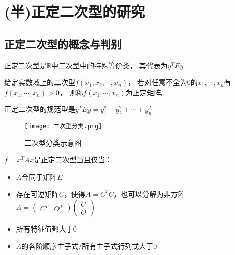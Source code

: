 \section{(半)正定二次型的研究}

\subsection{正定二次型的概念与判别}

正定二次型是$\mathbb{R}$中二次型中的特殊等价类，
其代表为$y^TEy$

\begin{definition}[正定二次型]
  给定实数域上的二次型$f(x_1,x_2,\cdots,x_n)$，
  若对任意不全为$0$的$x_1,\cdots,x_n$有$f(x_1,\cdots,x_n) > 0$，
  则称$f(x_1,\cdots,x_n)$为正定矩阵。
\end{definition}

\begin{theorem}[正定二次型的规范型]
  正定二次型的规范型是$y^TEy = y_1^2 + y_2^2 + \cdots + y_n^2$
\end{theorem}


\begin{figure}[htp]
  \centering
  \texttt{[image: 二次型分类.png]}
  \caption{二次型分类示意图}
\end{figure}

\begin{theorem}[正定充要条件]
  $f = x^TAx$是正定二次型当且仅当：
  \begin{itemize}
  \item $A$合同于矩阵$E$
  \item 存在可逆矩阵$C$，使得$A = C^T C$，也可以分解为非方阵$
    A  = \left(
      \begin{array}{cc}
        C^T&O^T
      \end{array}
    \right) \left(
      \begin{array}{c}
        C\\
        O
      \end{array}
    \right)
    $
  \item 所有特征值都大于$0$
  \item $A$的各阶顺序主子式/所有主子式行列式大于$0$
  \end{itemize}
\end{theorem}

